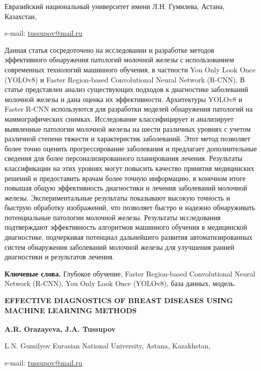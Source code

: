 \begin{affiliation}
Евразийский национальный университет имени Л.Н. Гумилева, Астана,
Казахстан,

e-mail: \href{mailto:oaris.83@gmail.com}{tussupov@mail.ru}
\end{affiliation}

Данная статья сосредоточено на исследовании и разработке методов
эффективного обнаружения патологий молочной железы с использованием
современных технологий машинного обучения, в частности You Only Look
Once (YOLOv8) и Faster Region-based Convolutional Neural Network
(R-CNN). В статье представлен анализ существующих подходов к диагностике
заболеваний молочной железы и дана оценка их эффективности. Архитектуры
YOLOv8 и Faster R-CNN используются для разработки моделей обнаружения
патологий на маммографических снимках. Исследование классифицирует и
анализирует выявленные патологии молочной железы на шести различных
уровнях с учетом различной степени тяжести и характеристик заболеваний.
Этот метод позволяет более точно оценить прогрессирование заболевания и
предлагает дополнительные сведения для более персонализированного
планирования лечения. Результаты классификации на этих уровнях могут
повысить качество принятия медицинских решений и предоставить врачам
более точную информацию, в конечном итоге повышая общую эффективность
диагностики и лечения заболеваний молочной железы. Экспериментальные
результаты показывают высокую точность и быструю обработку изображений,
что позволяет быстро и надежно обнаруживать потенциальные патологии
молочной железы. Результаты исследования подтверждают эффективность
алгоритмов машинного обучения в медицинской диагностике, подчеркивая
потенциал дальнейшего развития автоматизированных систем обнаружения
заболеваний молочной железы для улучшения ранней диагностики и
результатов лечения.

{\bfseries Ключевые слова.} Глубокое обучение, Faster Region-based
Convolutional Neural Network (R-CNN), You Only Look Once (YOLOv8), база
данных, модель.

\begin{articleheader}
{\bfseries EFFECTIVE DIAGNOSTICS OF BREAST DISEASES USING MACHINE LEARNING
METHODS}

{\bfseries A.R. Orazayeva, J.A. Tussupov\textsuperscript{\envelope }}
\end{articleheader}

\begin{affiliation}
L.N. Gumilyov Eurasian National University, Astana, Kazakhstan,

e-mail: \href{mailto:oaris.83@gmail.com}{tussupov@mail.ru}
\end{affiliation}


